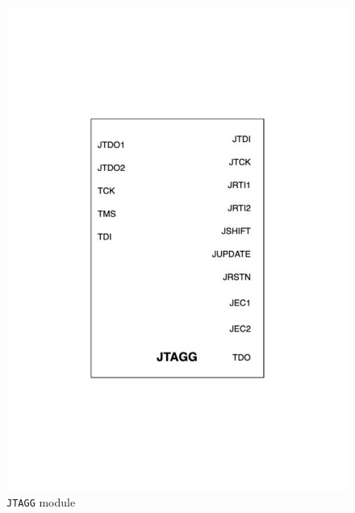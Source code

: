 \documentclass[a4paper,11pt,oneside]{report}
\begin{document}
\begin{figure}
    \centering
    \includegraphics[width=0.9\linewidth]{figures/jtagg_block_diagram.pdf}
    \caption{\texttt{JTAGG} module} 
    \label{fig:jtagg_block}
\end{figure}
\end{document}
